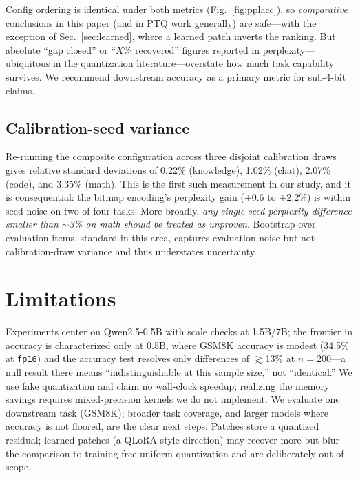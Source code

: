 \documentclass[11pt]{article}
\newcommand{\code}[1]{\texttt{#1}}
\begin{document}
Config ordering is identical under both metrics (Fig.~\ref{fig:pplacc}), so
\emph{comparative} conclusions in this paper (and in PTQ work generally) are
safe---with the exception of Sec.~\ref{sec:learned}, where a learned patch
inverts the ranking. But absolute ``gap closed'' or ``$X\%$ recovered''
figures reported in perplexity---ubiquitous in the quantization
literature---overstate how much task capability survives. We recommend
downstream accuracy as a primary metric for sub-4-bit claims.

\subsection{Calibration-seed variance}
Re-running the composite configuration across three disjoint calibration draws
gives relative standard deviations of 0.22\% (knowledge), 1.02\% (chat), 2.07\%
(code), and 3.35\% (math). This is the first such measurement in our study, and
it is consequential: the bitmap encoding's perplexity gain ($+0.6$ to $+2.2\%$)
is within seed noise on two of four tasks. More broadly, \emph{any single-seed
perplexity difference smaller than $\sim$3\% on math should be treated as
unproven}. Bootstrap over evaluation items, standard in this area, captures
evaluation noise but not calibration-draw variance and thus understates
uncertainty.

\section{Limitations}
Experiments center on Qwen2.5-0.5B with scale checks at 1.5B/7B; the frontier
in accuracy is characterized only at 0.5B, where GSM8K accuracy is modest
(34.5\% at \code{fp16}) and the accuracy test resolves only differences of
$\gtrsim$13\% at $n{=}200$---a null result there means ``indistinguishable at
this sample size,'' not ``identical.'' We use fake quantization and claim no
wall-clock speedup; realizing the memory savings requires mixed-precision
kernels we do not implement. We evaluate one downstream task (GSM8K);
broader task coverage, and larger models where accuracy is not floored, are
the clear next steps. Patches store a quantized residual; learned patches
(a QLoRA-style direction) may recover more but blur the comparison to
training-free uniform quantization and are deliberately out of scope.
\end{document}
